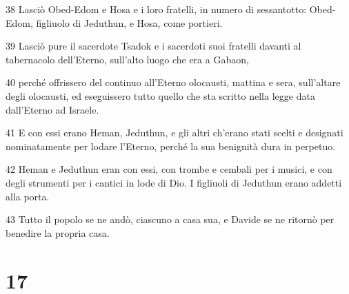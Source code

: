 \par 38 Lasciò Obed-Edom e Hosa e i loro fratelli, in numero di sessantotto: Obed-Edom, figliuolo di Jeduthun, e Hosa, come portieri.
\par 39 Lasciò pure il sacerdote Tsadok e i sacerdoti suoi fratelli davanti al tabernacolo dell'Eterno, sull'alto luogo che era a Gabaon,
\par 40 perché offrissero del continuo all'Eterno olocausti, mattina e sera, sull'altare degli olocausti, ed eseguissero tutto quello che sta scritto nella legge data dall'Eterno ad Israele.
\par 41 E con essi erano Heman, Jeduthun, e gli altri ch'erano stati scelti e designati nominatamente per lodare l'Eterno, perché la sua benignità dura in perpetuo.
\par 42 Heman e Jeduthun eran con essi, con trombe e cembali per i musici, e con degli strumenti per i cantici in lode di Dio. I figliuoli di Jeduthun erano addetti alla porta.
\par 43 Tutto il popolo se ne andò, ciascuno a casa sua, e Davide se ne ritornò per benedire la propria casa.

\chapter{17}

